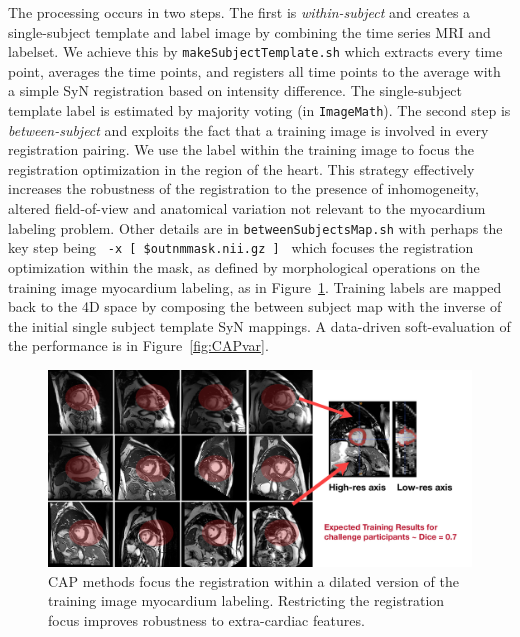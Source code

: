 \documentclass{llncs}
\begin{document}
The processing occurs in two steps. The first is {\em within-subject}
and creates a single-subject template and label image by combining the
time series MRI and labelset.  We achieve this by
\texttt{makeSubjectTemplate.sh} which extracts every time point,
averages the time points, and registers all time points to the average
with a simple SyN registration based on intensity difference.  The
single-subject template label is estimated by majority voting (in
\texttt{ImageMath}).  The second step is {\em between-subject} and
exploits the fact that a training image is involved in every
registration pairing.  We use the label within the training image to
focus the registration optimization in the region of the heart.  This
strategy effectively increases the robustness of the registration to
the presence of inhomogeneity, altered field-of-view and anatomical
variation not relevant to the myocardium labeling problem.  Other
details are in \texttt{betweenSubjectsMap.sh} with perhaps the key
step being \texttt{ -x [ \${outnm}mask.nii.gz   ] } which focuses
the registration optimization within the mask, as defined by
morphological operations on the training image myocardium labeling, as
in Figure~\ref{fig:Cmethods}.  Training labels are mapped back to the
4D space by composing the between subject map with the inverse of the
initial single subject template SyN mappings.  A data-driven
soft-evaluation of the performance is in Figure~\ref{fig:CAPvar}. 
\begin{figure}[t]
 \centering 
  \includegraphics[width=4.5in]{../figs/CAP_methods.pdf}
 \caption{CAP methods focus the registration within a dilated version
of the training image myocardium labeling.  Restricting the
registration focus improves robustness to extra-cardiac features.}
 \label{fig:Cmethods}
\end{figure}
\end{document}
